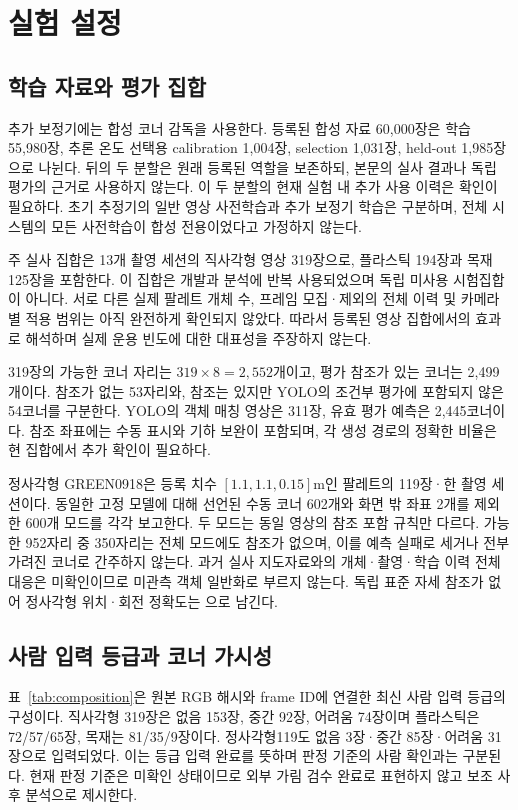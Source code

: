 \section{실험 설정}\label{sec:setup}
\subsection{학습 자료와 평가 집합}
추가 보정기에는 합성 코너 감독을 사용한다. 등록된 합성 자료 60,000장은 학습 55,980장, 추론 온도 선택용 calibration 1,004장, selection 1,031장, held-out 1,985장으로 나뉜다. 뒤의 두 분할은 원래 등록된 역할을 보존하되, 본문의 실사 결과나 독립 평가의 근거로 사용하지 않는다. 이 두 분할의 현재 실험 내 추가 사용 이력은 확인이 필요하다. 초기 추정기의 일반 영상 사전학습과 추가 보정기 학습은 구분하며, 전체 시스템의 모든 사전학습이 합성 전용이었다고 가정하지 않는다.

주 실사 집합은 13개 촬영 세션의 직사각형 영상 319장으로, 플라스틱 194장과 목재 125장을 포함한다. 이 집합은 개발과 분석에 반복 사용되었으며 독립 미사용 시험집합이 아니다. 서로 다른 실제 팔레트 개체 수, 프레임 모집·제외의 전체 이력 및 카메라별 적용 범위는 아직 완전하게 확인되지 않았다. 따라서 등록된 영상 집합에서의 효과로 해석하며 실제 운용 빈도에 대한 대표성을 주장하지 않는다.

319장의 가능한 코너 자리는 $319\times8=2,552$개이고, 평가 참조가 있는 코너는 2,499개이다. 참조가 없는 53자리와, 참조는 있지만 YOLO의 조건부 평가에 포함되지 않은 54코너를 구분한다. YOLO의 객체 매칭 영상은 311장, 유효 평가 예측은 2,445코너이다. 참조 좌표에는 수동 표시와 기하 보완이 포함되며, 각 생성 경로의 정확한 비율은 현 집합에서 추가 확인이 필요하다.

정사각형 GREEN0918은 등록 치수 $[1.1,1.1,0.15]$m인 팔레트의 119장·한 촬영 세션이다. 동일한 고정 모델에 대해 선언된 수동 코너 602개와 화면 밖 좌표 2개를 제외한 600개 모드를 각각 보고한다. 두 모드는 동일 영상의 참조 포함 규칙만 다르다. 가능한 952자리 중 350자리는 전체 모드에도 참조가 없으며, 이를 예측 실패로 세거나 전부 가려진 코너로 간주하지 않는다. 과거 실사 지도자료와의 개체·촬영·학습 이력 전체 대응은 미확인이므로 미관측 객체 일반화로 부르지 않는다. 독립 표준 자세 참조가 없어 정사각형 위치·회전 정확도는 \notrun 으로 남긴다.



\subsection{사람 입력 등급과 코너 가시성}
표~\ref{tab:composition}은 원본 RGB 해시와 frame ID에 연결한 최신 사람 입력 등급의 구성이다. 직사각형 319장은 없음 153장, 중간 92장, 어려움 74장이며 플라스틱은 72/57/65장, 목재는 81/35/9장이다. 정사각형119도 없음 3장·중간 85장·어려움 31장으로 입력되었다. 이는 등급 입력 완료를 뜻하며 판정 기준의 사람 확인과는 구분된다. 현재 판정 기준은 미확인 상태이므로 외부 가림 검수 완료로 표현하지 않고 보조 사후 분석으로 제시한다.

